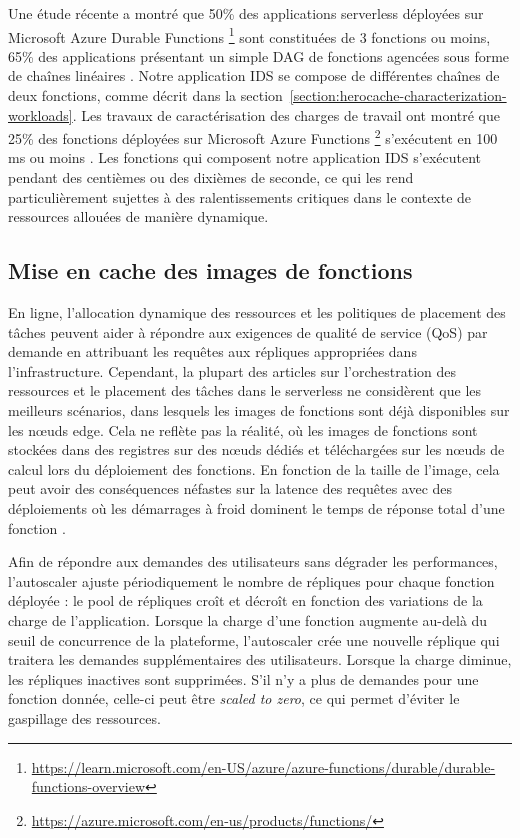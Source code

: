 Une étude récente a montré que 50\% des applications serverless déployées sur Microsoft Azure Durable Functions \footnote{\href{https://learn.microsoft.com/en-US/azure/azure-functions/durable/durable-functions-overview}{https://learn.microsoft.com/en-US/azure/azure-functions/durable/durable-functions-overview}} sont constituées de 3 fonctions ou moins, 65\% des applications présentant un simple DAG de fonctions agencées sous forme de chaînes linéaires \cite{mahgoubORIONThreeRights}. Notre application IDS se compose de différentes chaînes de deux fonctions, comme décrit dans la section~\ref{section:herocache-characterization-workloads}. Les travaux de caractérisation des charges de travail ont montré que 25\% des fonctions déployées sur Microsoft Azure Functions \footnote{\href{https://azure.microsoft.com/en-us/products/functions/}{https://azure.microsoft.com/en-us/products/functions/}} s'exécutent en 100 ms ou moins \cite{shahradServerlessWildCharacterizing}. Les fonctions qui composent notre application IDS s'exécutent pendant des centièmes ou des dixièmes de seconde, ce qui les rend particulièrement sujettes à des ralentissements critiques dans le contexte de ressources allouées de manière dynamique.

\subsection{Mise en cache des images de fonctions}
\label{section:herocache-background-cache}

En ligne, l'allocation dynamique des ressources et les politiques de placement des tâches peuvent aider à répondre aux exigences de qualité de service (QoS) par demande en attribuant les requêtes aux répliques appropriées dans l'infrastructure. Cependant, la plupart des articles sur l'orchestration des ressources et le placement des tâches dans le serverless ne considèrent que les meilleurs scénarios, dans lesquels les images de fonctions sont déjà disponibles sur les nœuds edge. Cela ne reflète pas la réalité, où les images de fonctions sont stockées dans des registres sur des nœuds dédiés et téléchargées sur les nœuds de calcul lors du déploiement des fonctions. En fonction de la taille de l'image, cela peut avoir des conséquences néfastes sur la latence des requêtes avec des déploiements où les démarrages à froid dominent le temps de réponse total d'une fonction \cite{yanHermesEfficientCache2020}.

Afin de répondre aux demandes des utilisateurs sans dégrader les performances, l'autoscaler ajuste périodiquement le nombre de répliques pour chaque fonction déployée : le pool de répliques croît et décroît en fonction des variations de la charge de l'application. Lorsque la charge d'une fonction augmente au-delà du seuil de concurrence de la plateforme, l'autoscaler crée une nouvelle réplique qui traitera les demandes supplémentaires des utilisateurs. Lorsque la charge diminue, les répliques inactives sont supprimées. S'il n'y a plus de demandes pour une fonction donnée, celle-ci peut être \textit{scaled to zero}, ce qui permet d'éviter le gaspillage des ressources.

